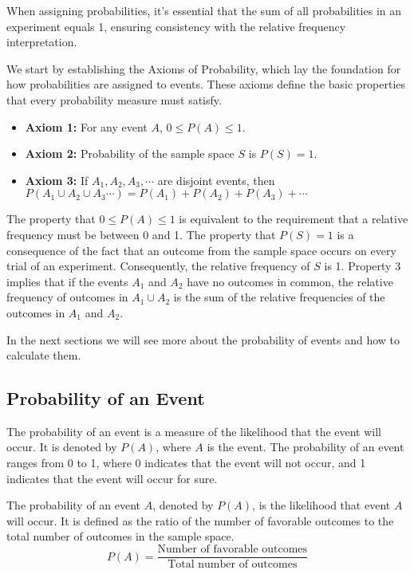 When assigning probabilities, it’s essential that the sum of all probabilities in an experiment equals 1, ensuring consistency with the relative frequency interpretation.

We start by establishing the Axioms of Probability, which lay the foundation for how probabilities are assigned to events. These axioms define the basic properties that every probability measure must satisfy.
    
\begin{axiom}
    \begin{itemize}
        \item \textbf{Axiom 1:} For any event \(A\), \( 0 \leq P(A) \leq 1 \).
        \item \textbf{Axiom 2:} Probability of the sample space \(S\) is \(P(S) = 1\).
        \item \textbf{Axiom 3:} If \(A_1, A_2, A_3, \cdots\) are disjoint events, then \(P\left(A_1 \cup A_2 \cup A_3 \cdots\right) = P\left(A_1\right) + P\left(A_2\right) + P\left(A_3\right) + \cdots\)
    \end{itemize}
\end{axiom}

The property that \( 0 \leq P(A) \leq 1 \) is equivalent to the requirement that a relative frequency must be between 0 and 1. The property that \( P(S) = 1 \) is a consequence of the fact that an outcome from the sample space occurs on every trial of an experiment. Consequently, the relative frequency of \( S \) is 1. Property 3 implies that if the events \( A_1 \) and \( A_2 \) have no outcomes in common, the relative frequency of outcomes in \( A_1 \cup A_2 \) is the sum of the relative frequencies of the outcomes in \( A_1 \) and \( A_2 \).

In the next sections we will see more about the probability of events and how to calculate them.

\subsection*{Probability of an Event}
The probability of an event is a measure of the likelihood that the event will occur. It is denoted by \( P(A) \), where \( A \) is the event. The probability of an event ranges from 0 to 1, where 0 indicates that the event will not occur, and 1 indicates that the event will occur for sure.

\begin{definition}
    The probability of an event \( A \), denoted by \( P(A) \), is the likelihood that event \( A \) will occur. It is defined as the ratio of the number of favorable outcomes to the total number of outcomes in the sample space.
    \[
    P(A) = \frac{\text{Number of favorable outcomes}}{\text{Total number of outcomes}}
    \]
\end{definition}


